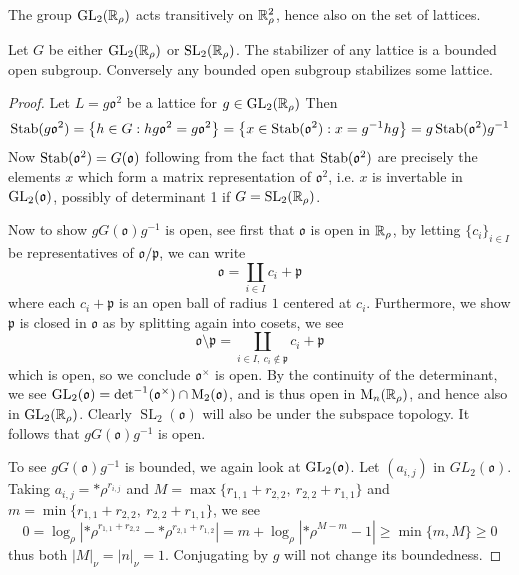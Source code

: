 \documentclass[draft]{amsart}
\DeclareMathOperator{\SL}{SL}
\begin{document}
    The group \(\mathrm{GL}_2(\mathbb{R}_\rho)\) acts transitively on \(\mathbb{R}^2_\rho\), hence also on the set of lattices.



    \begin{prop}
        Let \(G\) be either \(\mathrm{GL}_2(\mathbb{R}_\rho)\) or \(\SL_2(\R_\rho)\). The stabilizer of any lattice is a bounded open subgroup. Conversely any bounded open subgroup stabilizes some lattice.
    \end{prop}

    \begin{proof}
        Let \(L=g\mathfrak o^2\) be a lattice for \(g\in \mathrm{GL}_2(\mathbb{R}_\rho)\) Then
        \[\operatorname{Stab}(g\mathfrak o^2)=\left\{ h\in G : hg\mathfrak o^2=g\mathfrak o^2 \right\} =\left\{ x\in \operatorname{Stab}(\mathfrak o^2) : x=g^{-1}hg \right\}=g\operatorname{Stab}(\mathfrak o^2) g^{-1}\]
        Now \(\operatorname{Stab}(\mathfrak o^2)=G(\mathfrak o)\) following from the fact that \(\operatorname{Stab}(\mathfrak o^2)\) are precisely the elements \(x\) which form a matrix representation of \(\mathfrak o^2\), i.e. \(x\) is invertable in \(\mathrm{GL}_2(\mathfrak o)\), possibly of determinant 1 if \(G=\SL_2(\R_\rho)\). 

        Now to show \(g G(\mathfrak o)g^{-1}\) is open, see  first that \(\mathfrak o\) is open in \(\mathbb{R}_\rho\), by letting \(\{c_i\}_{i\in I}\) be representatives of \(\mathfrak o / \mathfrak p\), we can write
        \[\mathfrak o = \coprod_{i\in I}c_i+\mathfrak p\]
        where each \(c_i+\mathfrak p\) is an open ball of radius \(1\) centered at \(c_i\). Furthermore, we show \(\mathfrak p\) is closed in \(\mathfrak o\) as by splitting again into cosets, we see
        \[\mathfrak o \setminus \mathfrak p =\coprod_{i\in I,\ c_i \notin \mathfrak p}c_i+\mathfrak p\]
        which is open, so we conclude \(\mathfrak o ^\times\) is open. By the continuity of the determinant, we see \(\mathrm{GL}_2(\mathfrak o)=\det^{-1}(\mathfrak{o}^\times)\cap \mathrm M_2(\mathfrak o)\), and is thus open in \(\mathrm M_n(\mathbb{R}_\rho)\), and hence also in \(\mathrm{GL}_2(\mathbb{R}_\rho)\). Clearly \(\SL_2(\mathfrak o)\) will also be under the subspace topology. It follows that \(g G(\mathfrak o)g^{-1}\) is open.

        To see \(g G(\mathfrak o)g^{-1}\) is bounded, we again look at \(\mathrm{GL}_2(\mathfrak o)\).  Let \((a_{i,j})\) in \(GL_2(\mathfrak o)\). Taking \(a_{i,j}=*\rho^{r_{i,j}}\) and \(M=\max\{r_{1,1}+r_{2,2},\ r_{2,2}+r_{1,1}\}\) and \(m=\min\{r_{1,1}+r_{2,2},\ r_{2,2}+r_{1,1}\}\), we see  \[0=\log_\rho |{*\rho}^{r_{1,1}+r_{2,2}}-*\rho^{r_{2,1}+r_{1,2}}|=m+\log_\rho |{*\rho }^{M-m}-1|\ge \min\{m,M\}\ge 0\]
        thus both \(|M|_\nu=|n|_\nu = 1\).  Conjugating by \(g\) will not change its boundedness. 


\end{proof}
\end{document}
